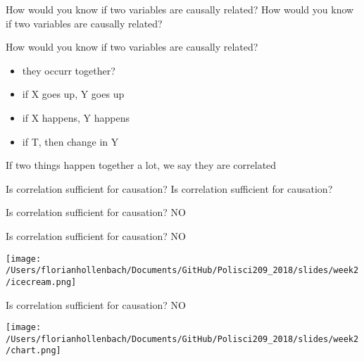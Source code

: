 \documentclass[presentation]{beamer}
\begin{document}
\begin{frame}[label={sec:orga15d5d1}]{How would you know if two variables are causally related?}
\Large{How would you know if two variables are causally related?}
\end{frame}


\begin{frame}[label={sec:org008c61c}]{How would you know if two variables are causally related?}
\begin{itemize}
\item they occurr together?
\item if X goes up, Y goes up
\item if X happens, Y happens
\item if T, then change in Y
\end{itemize}


\pause
If two things happen together a lot, we say they are correlated
\end{frame}

\begin{frame}[label={sec:org4433bfe}]{Is correlation sufficient for causation?}
\Large{Is correlation sufficient for causation?}
\end{frame}

\begin{frame}[label={sec:org6182fe0}]{Is correlation sufficient for causation?}
\LARGE{NO}
\end{frame}

\begin{frame}[label={sec:orgee2e24d}]{Is correlation sufficient for causation?}
\LARGE{NO}

\begin{center}
\texttt{[image: /Users/florianhollenbach/Documents/GitHub/Polisci209\_2018/slides/week2/icecream.png]}
\end{center}
\end{frame}


\begin{frame}[label={sec:orgea43bcc}]{Is correlation sufficient for causation?}
\LARGE{NO}

\begin{center}
\texttt{[image: /Users/florianhollenbach/Documents/GitHub/Polisci209\_2018/slides/week2/chart.png]}
\end{center}
\end{frame}
\end{document}
